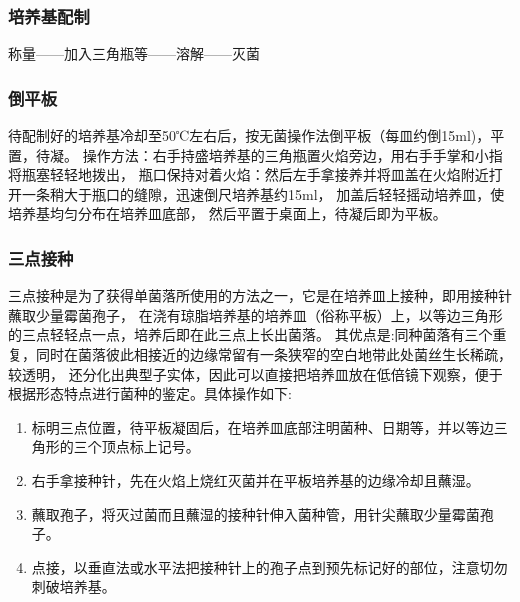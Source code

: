 \documentclass[UTF8]{article}
\begin{document}
    \subsubsection{培养基配制}
    称量——加入三角瓶等——溶解——灭菌
    \subsubsection{倒平板}
    待配制好的培养基冷却至50℃左右后，按无菌操作法倒平板（每皿约倒15ml)，平置，待凝。
    操作方法：右手持盛培养基的三角瓶置火焰旁边，用右手手掌和小指将瓶塞轻轻地拨出，
    瓶口保持对着火焰：然后左手拿接养并将皿盖在火焰附近打开一条稍大于瓶口的缝隙，迅速倒尺培养基约15ml，
    加盖后轻轻摇动培养皿，使培养基均匀分布在培养皿底部， 然后平置于桌面上，待凝后即为平板。
    \subsubsection{三点接种}
    三点接种是为了获得单菌落所使用的方法之一，它是在培养皿上接种，即用接种针蘸取少量霉菌孢子，
    在浇有琼脂培养基的培养皿（俗称平板）上，以等边三角形的三点轻轻点一点，培养后即在此三点上长出菌落。
    其优点是:同种菌落有三个重复，同时在菌落彼此相接近的边缘常留有一条狭窄的空白地带此处菌丝生长稀疏，较透明，
    还分化出典型子实体，因此可以直接把培养皿放在低倍镜下观察，便于根据形态特点进行菌种的鉴定。具体操作如下:
    \begin{enumerate}
      \item 标明三点位置，待平板凝固后，在培养皿底部注明菌种、日期等，并以等边三角形的三个顶点标上记号。
      \item 右手拿接种针，先在火焰上烧红灭菌并在平板培养基的边缘冷却且蘸湿。
      \item 蘸取孢子，将灭过菌而且蘸湿的接种针伸入菌种管，用针尖蘸取少量霉菌孢子。
      \item 点接，以垂直法或水平法把接种针上的孢子点到预先标记好的部位，注意切勿刺破培养基。
    \end{enumerate}
\end{document}
